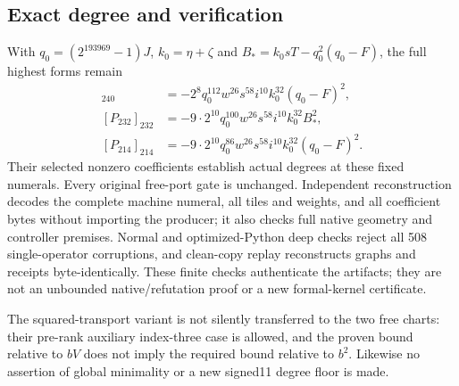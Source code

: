 \subsection{Exact degree and verification}
With $q_0=(2^{193969}-1)J$, $k_0=\eta+\zeta$ and
$B_* = k_0sT-q_0^2(q_0-F)$, the full highest forms remain
\begin{align*}
 [P_{240}]_{240}&=-2^8q_0^{112}w^{26}s^{58}i^{10}k_0^{32}(q_0-F)^2,\\
 [P_{232}]_{232}&=-9\cdot2^{10}q_0^{100}w^{26}s^{58}i^{10}k_0^{32}B_*^2,\\
 [P_{214}]_{214}&=-9\cdot2^{10}q_0^{86}w^{26}s^{58}i^{10}k_0^{32}(q_0-F)^2.
\end{align*}
Their selected nonzero coefficients establish actual degrees at these fixed
numerals. Every original free-port gate is unchanged. Independent reconstruction
decodes the complete machine numeral, all tiles and weights, and all coefficient
bytes without importing the producer; it also checks full native geometry and
controller premises. Normal and optimized-Python deep checks reject all 508
single-operator corruptions, and clean-copy replay reconstructs graphs and
receipts byte-identically. These finite checks authenticate the artifacts;
they are not an unbounded native/refutation proof or a new formal-kernel
certificate.

The squared-transport variant is not silently transferred to the two free
charts: their pre-rank auxiliary index-three case is allowed, and the proven
bound relative to $bV$ does not imply the required bound relative to $b^2$.
Likewise no assertion of global minimality or a new signed11 degree floor is
made.
